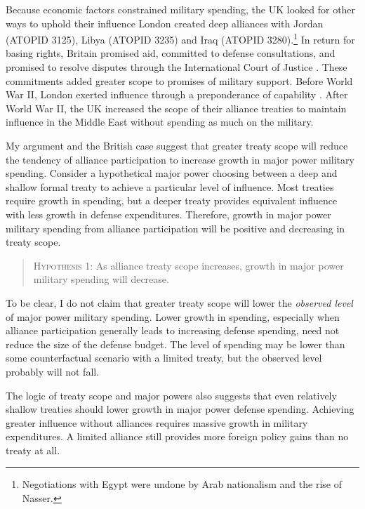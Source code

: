 \documentclass[12pt]{article}
\begin{document}
Because economic factors constrained military spending, the UK looked for other ways to uphold their influence \citep{Monroe1963, Louis1984}
London created deep alliances with Jordan (ATOPID 3125), Libya (ATOPID 3235) and Iraq (ATOPID 3280).\footnote{Negotiations with Egypt were undone by Arab nationalism and the rise of Nasser.} 
In return for basing rights, Britain promised aid, committed to defense consultations, and promised to resolve disputes through the International Court of Justice \citep{Leedsetal2002}. 
These commitments added greater scope to promises of military support. 
Before World War II, London exerted influence through a preponderance of capability \citep{Monroe1963}.
After World War II, the UK increased the scope of their alliance treaties to maintain influence in the Middle East without spending as much on the military. 


My argument and the British case suggest that greater treaty scope will reduce the tendency of alliance participation to increase growth in major power military spending.
Consider a hypothetical major power choosing between a deep and shallow formal treaty to achieve a particular level of influence.  
Most treaties require growth in spending, but a deeper treaty provides equivalent influence with less growth in defense expenditures. 
Therefore, growth in major power military spending from alliance participation will be positive and decreasing in treaty scope. 


\begin{quote}
\textsc{Hypothesis 1}: As alliance treaty scope increases, growth in major power military spending will decrease. 
\end{quote}


To be clear, I do not claim that greater treaty scope will lower the \textit{observed level} of major power military spending. 
Lower growth in spending, especially when alliance participation generally leads to increasing defense spending, need not reduce the size of the defense budget. 
The level of spending may be lower than some counterfactual scenario with a limited treaty, but the observed level probably will not fall. 


The logic of treaty scope and major powers also suggests that even relatively shallow treaties should lower growth in major power defense spending. 
Achieving greater influence without alliances requires massive growth in military expenditures. 
A limited alliance still provides more foreign policy gains than no treaty at all. 
\end{document}
